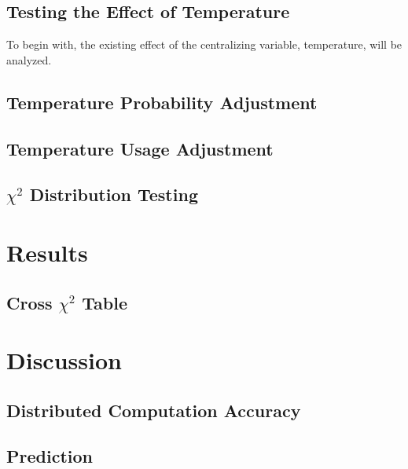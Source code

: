 \documentclass[a4paper]{article}
\begin{document}
    \subsection{Testing the Effect of Temperature}
        To begin with, the existing effect of the centralizing variable, temperature, will be analyzed.
    \subsection{Temperature Probability Adjustment}
    \subsection{Temperature Usage Adjustment}
    \subsection{$\chi^2$ Distribution Testing}
\section{Results}
    \subsection{Cross $\chi^2$ Table}
\section{Discussion}
    \subsection{Distributed Computation Accuracy}
    \subsection{Prediction}



\end{document}
